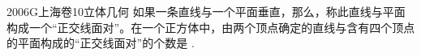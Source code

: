 
\begin{problem}{2006}{G}{上海卷}{10}{立体几何}
如果一条直线与一个平面垂直，那么，称此直线与平面构成一个“正交线面对”。在一个正方体中，由两个顶点确定的直线与含有四个顶点的平面构成的“正交线面对”的个数是 \underline{\hspace{4em}}.
\end{problem}

\begin{answer}

\end{answer}

\begin{solutions}

\end{solutions}